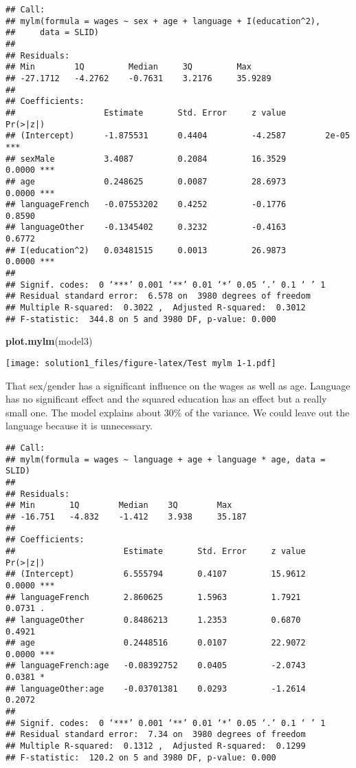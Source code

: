 \documentclass[
]{article}
\newenvironment{Shaded}{\begin{snugshade}}{\end{snugshade}}
\newcommand{\FunctionTok}[1]{\textcolor[rgb]{0.13,0.29,0.53}{\textbf{#1}}}
\newcommand{\NormalTok}[1]{#1}
\begin{document}
\begin{verbatim}
## Call:
## mylm(formula = wages ~ sex + age + language + I(education^2), 
##     data = SLID)
## 
## Residuals:
## Min        1Q         Median     3Q         Max        
## -27.1712   -4.2762    -0.7631    3.2176     35.9289    
## 
## Coefficients:
##                  Estimate       Std. Error     z value        Pr(>|z|)       
## (Intercept)      -1.875531      0.4404         -4.2587        2e-05 ***      
## sexMale          3.4087         0.2084         16.3529        0.0000 ***     
## age              0.248625       0.0087         28.6973        0.0000 ***     
## languageFrench   -0.07553202    0.4252         -0.1776        0.8590         
## languageOther    -0.1345402     0.3232         -0.4163        0.6772         
## I(education^2)   0.03481515     0.0013         26.9873        0.0000 ***     
## 
## Signif. codes:  0 ‘***’ 0.001 ‘**’ 0.01 ‘*’ 0.05 ‘.’ 0.1 ‘ ’ 1
## Residual standard error:  6.578 on  3980 degrees of freedom 
## Multiple R-squared:  0.3022 ,  Adjusted R-squared:  0.3012 
## F-statistic:  344.8 on 5 and 3980 DF, p-value: 0.000
\end{verbatim}

\begin{Shaded}
\begin{Highlighting}[]
\FunctionTok{plot.mylm}\NormalTok{(model3)}
\end{Highlighting}
\end{Shaded}

\texttt{[image: solution1\_files/figure-latex/Test mylm 1-1.pdf]}

That sex/gender has a significant influence on the wages as well as age.
Language has no significant effect and the squared education has an
effect but a really small one. The model explains about 30\% of the
variance. We could leave out the language because it is unnecessary.

\begin{verbatim}
## Call:
## mylm(formula = wages ~ language + age + language * age, data = SLID)
## 
## Residuals:
## Min       1Q        Median    3Q        Max       
## -16.751   -4.832    -1.412    3.938     35.187    
## 
## Coefficients:
##                      Estimate       Std. Error     z value        Pr(>|z|)       
## (Intercept)          6.555794       0.4107         15.9612        0.0000 ***     
## languageFrench       2.860625       1.5963         1.7921         0.0731 .       
## languageOther        0.8486213      1.2353         0.6870         0.4921         
## age                  0.2448516      0.0107         22.9072        0.0000 ***     
## languageFrench:age   -0.08392752    0.0405         -2.0743        0.0381 *       
## languageOther:age    -0.03701381    0.0293         -1.2614        0.2072         
## 
## Signif. codes:  0 ‘***’ 0.001 ‘**’ 0.01 ‘*’ 0.05 ‘.’ 0.1 ‘ ’ 1
## Residual standard error:  7.34 on  3980 degrees of freedom 
## Multiple R-squared:  0.1312 ,  Adjusted R-squared:  0.1299 
## F-statistic:  120.2 on 5 and 3980 DF, p-value: 0.000
\end{verbatim}
\end{document}
